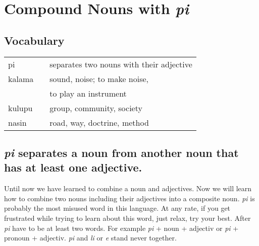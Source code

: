 \section{Compound Nouns with \textit{pi}}
%
\subsection*{Vocabulary}
%
\begin{supertabular}{p{5,5cm}|ll}
pi && separates two nouns with their adjective \\
kalama && sound, noise; to make noise, \\ && to play an instrument \\
kulupu && group, community, society \\
nasin && road, way, doctrine, method \\
\end{supertabular}  

\subsection*{\textit{pi} separates a noun from another noun that has at least one adjective.}

Until now we have learned to combine a noun and adjectives. 
Now we will learn how to combine two nouns including their adjectives into a composite noun. 
\textit{pi} is probably the most misused word in this language. 
At any rate, if you get frustrated while trying to learn about this word, just relax, try your best. 
After \textit{pi} have to be at least two words. 
For example \textit{pi} + noun + adjectiv or \textit{pi} + pronoun + adjectiv. 
\textit{pi} and \textit{li} or \textit{e} stand never together.
%
